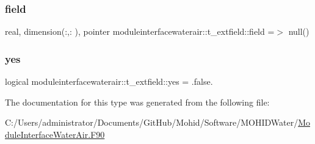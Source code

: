 \subsubsection{\texorpdfstring{field}{field}}
{\footnotesize\ttfamily real, dimension(\+:,\+:  ), pointer moduleinterfacewaterair\+::t\+\_\+extfield\+::field =$>$ null()\hspace{0.3cm}{\ttfamily [private]}}

\mbox{\label{structmoduleinterfacewaterair_1_1t__extfield_aa407514dfdccc7f96550c090722397ac}} 
\subsubsection{\texorpdfstring{yes}{yes}}
{\footnotesize\ttfamily logical moduleinterfacewaterair\+::t\+\_\+extfield\+::yes = .false.\hspace{0.3cm}{\ttfamily [private]}}



The documentation for this type was generated from the following file\+:\begin{DoxyCompactItemize}
\item 
C\+:/\+Users/administrator/\+Documents/\+Git\+Hub/\+Mohid/\+Software/\+M\+O\+H\+I\+D\+Water/\mbox{\hyperlink{_module_interface_water_air_8_f90}{Module\+Interface\+Water\+Air.\+F90}}\end{DoxyCompactItemize}
